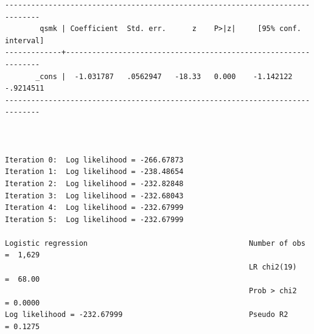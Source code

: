 \documentclass[
  10pt,
  a4paper,
]{book}
\begin{document}
\begin{verbatim}
------------------------------------------------------------------------------
        qsmk | Coefficient  Std. err.      z    P>|z|     [95% conf. interval]
-------------+----------------------------------------------------------------
       _cons |  -1.031787   .0562947   -18.33   0.000    -1.142122   -.9214511
------------------------------------------------------------------------------



Iteration 0:  Log likelihood = -266.67873  
Iteration 1:  Log likelihood = -238.48654  
Iteration 2:  Log likelihood = -232.82848  
Iteration 3:  Log likelihood = -232.68043  
Iteration 4:  Log likelihood = -232.67999  
Iteration 5:  Log likelihood = -232.67999  

Logistic regression                                     Number of obs =  1,629
                                                        LR chi2(19)   =  68.00
                                                        Prob > chi2   = 0.0000
Log likelihood = -232.67999                             Pseudo R2     = 0.1275


\end{verbatim}
\end{document}
